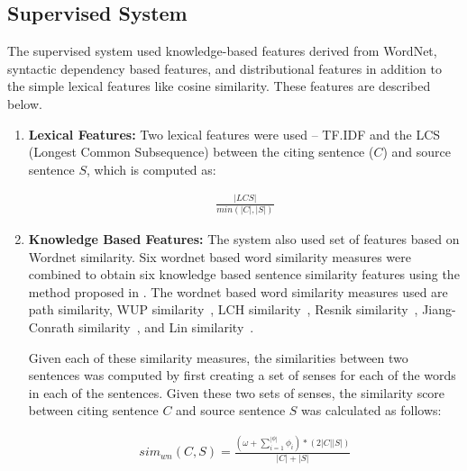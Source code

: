\documentclass[11pt]{article}
\begin{document}
\subsection{Supervised System}
The supervised system used knowledge-based features derived from WordNet,
syntactic dependency based features, and distributional features in addition 
to the simple lexical features like cosine similarity. These features are 
described below.

\begin{enumerate}
\item{\bf Lexical Features:} Two lexical features were used -- TF.IDF and the 
LCS (Longest Common Subsequence) between the citing sentence ($C$) and source 
sentence $S$, which is computed as:

\vspace{-.3cm}
\begin{eqnarray*}
  \frac{|LCS|}{min(|C|,|S|)}
\end{eqnarray*}

\item{\bf Knowledge Based Features:} The system also used set of features 
based on Wordnet similarity. Six wordnet based word similarity measures were 
combined to obtain six knowledge based sentence similarity features using the 
method proposed in \cite{Banea2012}. The wordnet based word similarity 
measures used are path similarity, WUP 
similarity~\cite{Wu:1994:VSL:981732.981751}, 
LCH similarity~\cite{leacock1998combining}, 
Resnik similarity~\cite{Resnik:1995:UIC:1625855.1625914}, Jiang-Conrath 
similarity~\cite{Jiang97taxonomySimilarity}, and Lin 
similarity~\cite{Lin:1998:IDS:645527.657297}. 

Given each of these similarity measures, the similarities between two 
sentences was computed by first creating a set of senses for each of the words 
in each of the sentences. Given these two sets of senses, the similarity 
score between citing sentence $C$ and source sentence $S$ was calculated 
as follows:

\vspace{-.3cm}
\begin{eqnarray*}
  sim_{wn}(C,S) = \frac{(\omega + \sum_{i=1}^{|\phi|}\phi_i) * (2|C||S|)}{|C|+|S|}
\end{eqnarray*}


\end{enumerate}
\end{document}
